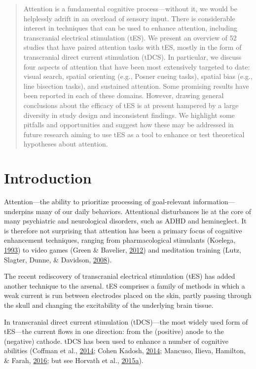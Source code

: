 \documentclass[11pt,]{memoir}
\begin{document}
\begin{abstract}
Attention is a fundamental cognitive process---without it, we would be helplessly adrift in an overload of sensory input. There is considerable interest in techniques that can be used to enhance attention, including transcranial electrical stimulation (tES). We present an overview of 52 studies that have paired attention tasks with tES, mostly in the form of transcranial direct current stimulation (tDCS). In particular, we discuss four aspects of attention that have been most extensively targeted to date: visual search, spatial orienting (e.g., Posner cueing tasks), spatial bias (e.g., line bisection tasks), and sustained attention. Some promising results have been reported in each of these domains. However, drawing general conclusions about the efficacy of tES is at present hampered by a large diversity in study design and inconsistent findings. We highlight some pitfalls and opportunities and suggest how these may be addressed in future research aiming to use tES as a tool to enhance or test theoretical hypotheses about attention.
\end{abstract} \newpage

\hypertarget{tDCS_att_review-introduction}{%
\section{Introduction}\label{tDCS_att_review-introduction}}

Attention---the ability to prioritize processing of goal-relevant information---underpins many of our daily behaviors. Attentional disturbances lie at the core of many psychiatric and neurological disorders, such as ADHD and hemineglect. It is therefore not surprising that attention has been a primary focus of cognitive enhancement techniques, ranging from pharmacological stimulants (Koelega, \protect\hyperlink{ref-Koelega1993}{1993}) to video games (Green \& Bavelier, \protect\hyperlink{ref-Green2012}{2012}) and meditation training (Lutz, Slagter, Dunne, \& Davidson, \protect\hyperlink{ref-Lutz2008}{2008}).

The recent rediscovery of transcranial electrical stimulation (tES) has added another technique to the arsenal. tES comprises a family of methods in which a weak current is run between electrodes placed on the skin, partly passing through the skull and changing the excitability of the underlying brain tissue.

In transcranial direct current stimulation (tDCS)---the most widely used form of tES---the current flows in one direction: from the (positive) anode to the (negative) cathode. tDCS has been used to enhance a number of cognitive abilities (Coffman et al., \protect\hyperlink{ref-Coffman2014}{2014}; Cohen Kadosh, \protect\hyperlink{ref-CohenKadosh2014}{2014}; Mancuso, Ilieva, Hamilton, \& Farah, \protect\hyperlink{ref-Mancuso2016}{2016}; but see Horvath et al., \protect\hyperlink{ref-Horvath2015}{2015}\protect\hyperlink{ref-Horvath2015}{a}).
\end{document}
